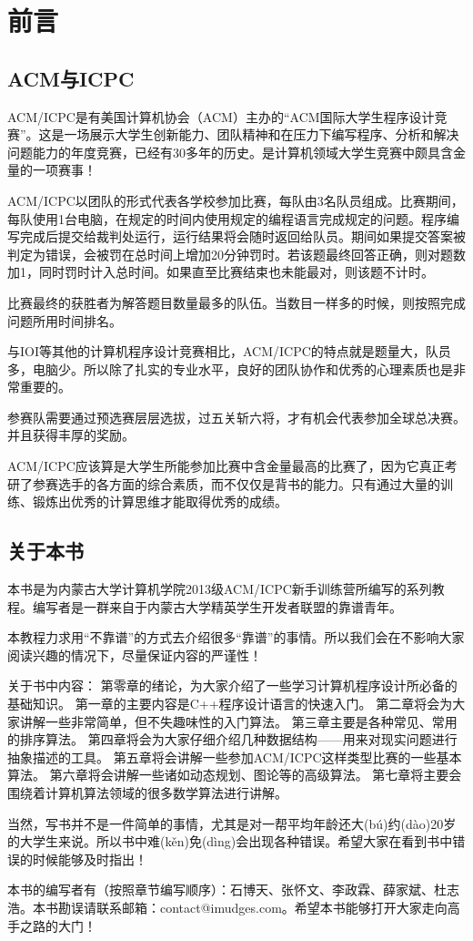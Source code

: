 \chapter*{前言}

\section*{ACM与ICPC}

ACM/ICPC是有美国计算机协会（ACM）主办的“ACM国际大学生程序设计竞赛”。这是一场展示大学生创新能力、团队精神和在压力下编写程序、分析和解决问题能力的年度竞赛，已经有30多年的历史。是计算机领域大学生竞赛中颇具含金量的一项赛事！

ACM/ICPC以团队的形式代表各学校参加比赛，每队由3名队员组成。比赛期间，每队使用1台电脑，在规定的时间内使用规定的编程语言完成规定的问题。程序编写完成后提交给裁判处运行，运行结果将会随时返回给队员。期间如果提交答案被判定为错误，会被罚在总时间上增加20分钟罚时。若该题最终回答正确，则对题数加1，同时罚时计入总时间。如果直至比赛结束也未能最对，则该题不计时。

比赛最终的获胜者为解答题目数量最多的队伍。当数目一样多的时候，则按照完成问题所用时间排名。

与IOI等其他的计算机程序设计竞赛相比，ACM/ICPC的特点就是题量大，队员多，电脑少。所以除了扎实的专业水平，良好的团队协作和优秀的心理素质也是非常重要的。

参赛队需要通过预选赛层层选拔，过五关斩六将，才有机会代表参加全球总决赛。并且获得丰厚的奖励。

ACM/ICPC应该算是大学生所能参加比赛中含金量最高的比赛了，因为它真正考研了参赛选手的各方面的综合素质，而不仅仅是背书的能力。只有通过大量的训练、锻炼出优秀的计算思维才能取得优秀的成绩。

\section*{关于本书}

本书是为内蒙古大学计算机学院2013级ACM/ICPC新手训练营所编写的系列教程。编写者是一群来自于内蒙古大学精英学生开发者联盟的靠谱青年。

本教程力求用“不靠谱”的方式去介绍很多“靠谱”的事情。所以我们会在不影响大家阅读兴趣的情况下，尽量保证内容的严谨性！

关于书中内容：
第零章的绪论，为大家介绍了一些学习计算机程序设计所必备的基础知识。
第一章的主要内容是C++程序设计语言的快速入门。
第二章将会为大家讲解一些非常简单，但不失趣味性的入门算法。
第三章主要是各种常见、常用的排序算法。
第四章将会为大家仔细介绍几种数据结构——用来对现实问题进行抽象描述的工具。
第五章将会讲解一些参加ACM/ICPC这样类型比赛的一些基本算法。
第六章将会讲解一些诸如动态规划、图论等的高级算法。
第七章将主要会围绕着计算机算法领域的很多数学算法进行讲解。

当然，写书并不是一件简单的事情，尤其是对一帮平均年龄还大(bú)约(dào)20岁的大学生来说。所以书中难(kěn)免(dìng)会出现各种错误。希望大家在看到书中错误的时候能够及时指出！

本书的编写者有（按照章节编写顺序）：石博天、张怀文、李政霖、薛家斌、杜志浩。本书勘误请联系邮箱：contact@imudges.com。希望本书能够打开大家走向高手之路的大门！ 
